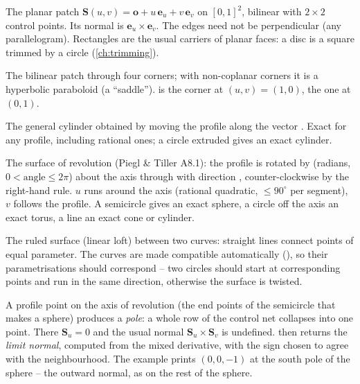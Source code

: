 \begin{description}[style=nextline]
\item[\apiref{make_rectangle}\code{(origin, edge_u, edge_v)}]
  The planar patch $\mathbf S(u,v) = \mathbf o + u\,\mathbf e_u + v\,\mathbf e_v$ on $[0,1]^2$,
  bilinear with $2\times2$ control points. Its normal is $\mathbf e_u \times \mathbf e_v$. The
  edges need not be perpendicular (any parallelogram). Rectangles are the usual carriers of
  planar faces: a disc is a square trimmed by a circle (\cref{ch:trimming}).
\item[\apiref{make_bilinear}\code{(p00, p10, p01, p11)}]
  The bilinear patch through four corners; with non-coplanar corners it is a hyperbolic
  paraboloid (a ``saddle'').  is the corner at $(u,v)=(1,0)$,  the one at
  $(0,1)$.
\item[\apiref{extrude}\code{(profile, direction)}]
  The general cylinder obtained by moving the profile along the vector .
  Exact for any profile, including rational ones; a circle extruded gives an exact cylinder.
\item[\apiref{revolve}\code{(profile, axis_point, axis_dir, angle)}]
  The surface of revolution (Piegl \& Tiller A8.1): the profile is rotated by 
  (radians, $0 < \text{angle} \le 2\pi$) about the axis through  with direction
  , counter-clockwise by the right-hand rule. $u$ runs around the axis (rational
  quadratic, $\le 90^\circ$ per segment), $v$ follows the profile. A semicircle gives an exact
  sphere, a circle off the axis an exact torus, a line an exact cone or cylinder.
\item[\apiref{ruled}\code{(c0, c1)}]
  The ruled surface (linear loft) between two curves: straight lines connect points of equal
  parameter. The curves are made compatible automatically (), so their
  parametrisations should correspond -- two circles should start at corresponding points and
  run in the same direction, otherwise the surface is twisted.
\end{description}

\begin{note}[Poles]
A profile point on the axis of revolution (the end points of the semicircle that makes a sphere)
produces a \emph{pole}: a whole row of the control net collapses into one point. There
$\mathbf S_u = 0$ and the usual normal $\mathbf S_u\times\mathbf S_v$ is undefined.
 then returns the \emph{limit normal}, computed from the mixed derivative, with
the sign chosen to agree with the neighbourhood. The example prints $(0,0,-1)$ at the south pole
of the sphere -- the outward normal, as on the rest of the sphere.
\end{note}

